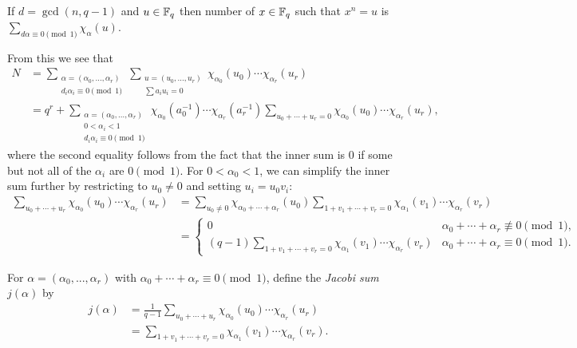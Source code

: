 \documentclass[letterpaper,11pt]{article}
\begin{document}
\begin{prop} If $d = \gcd(n,q-1)$ and $u\in \mathbb{F}_q$ then number of $x\in \mathbb{F}_q$ such that $x^n = u$ is $\sum_{d\alpha \equiv 0\pmod{1}} \chi_\alpha(u)$.
\end{prop}

From this we see that
\begin{align*}
N &= \sum_{\substack{\alpha=(\alpha_0,...,\alpha_r)\\ d_i\alpha_i \equiv 0\pmod{1}}} \sum_{\substack{u=(u_0,...,u_r)\\ \sum a_iu_i = 0}} \chi_{\alpha_0}(u_0)\cdots\chi_{\alpha_r}(u_r)\\
&= q^r + \sum_{\substack{\alpha=(\alpha_0,...,\alpha_r)\\ 0 < \alpha_i < 1\\ d_i\alpha_i \equiv 0\pmod{1}}} \chi_{\alpha_0}(a_0^{-1})\cdots\chi_{\alpha_r}(a_r^{-1}) \sum_{u_0 + \cdots + u_r = 0} \chi_{\alpha_0}(u_0)\cdots\chi_{\alpha_r}(u_r),
\end{align*}
where the second equality follows from the fact that the inner sum is $0$ if some but not all of the $\alpha_i$ are $0\pmod{1}$. For $0 < \alpha_0 < 1$, we can simplify the inner sum further by restricting to $u_0 \ne 0$ and setting $u_i = u_0v_i$:
\begin{align*}
\sum_{u_0+\cdots+u_r} \chi_{\alpha_0}(u_0)\cdots\chi_{\alpha_r}(u_r) &= \sum_{u_0 \ne 0} \chi_{\alpha_0+\cdots+\alpha_r}(u_0) \sum_{1+v_1+\cdots+v_r = 0} \chi_{\alpha_1}(v_1)\cdots\chi_{\alpha_r}(v_r)\\
&= \begin{cases} 0 & \alpha_0 + \cdots + \alpha_r \not\equiv 0\pmod{1},\\ (q-1)\sum_{1+v_1+\cdots+v_r = 0} \chi_{\alpha_1}(v_1)\cdots\chi_{\alpha_r}(v_r) & \alpha_0+\cdots+\alpha_r \equiv 0 \pmod{1}.\end{cases}
\end{align*}

\begin{defn} For $\alpha = (\alpha_0, ..., \alpha_r)$ with $\alpha_0 + \cdots + \alpha_r \equiv 0 \pmod{1}$, define the \emph{Jacobi sum} $j(\alpha)$ by
\begin{align*}
j(\alpha) &= \frac{1}{q-1}\sum_{u_0+\cdots+u_r} \chi_{\alpha_0}(u_0)\cdots\chi_{\alpha_r}(u_r)\\
&= \sum_{1+v_1+\cdots+v_r = 0} \chi_{\alpha_1}(v_1)\cdots\chi_{\alpha_r}(v_r).
\end{align*}
\end{defn}
\end{document}
